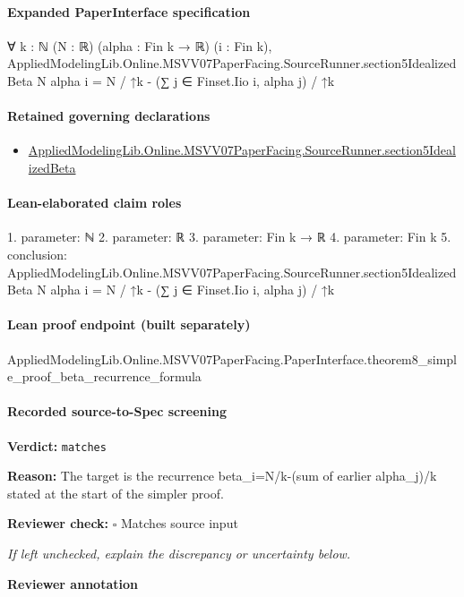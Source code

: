 \documentclass[10pt]{article}
\newcommand{\reviewerbox}{%
  \par\noindent\fbox{\parbox{0.96\linewidth}{\rule{0pt}{0.38in}}}\par
}
\newcommand{\reviewmatch}[1]{%
  \par\noindent\textbf{Reviewer check:} $\square$\; #1\par
  \noindent\emph{If left unchecked, explain the discrepancy or uncertainty below.}\par
}
\begin{document}
\paragraph{Expanded PaperInterface specification}
\begin{ReviewVerbatim}
∀ {k : ℕ} (N : ℝ) (alpha : Fin k → ℝ) (i : Fin k),
  AppliedModelingLib.Online.MSVV07PaperFacing.SourceRunner.section5IdealizedBeta N alpha i =
    N / ↑k - (∑ j ∈ Finset.Iio i, alpha j) / ↑k
\end{ReviewVerbatim}

\paragraph{Retained governing declarations}
\begin{itemize}\raggedright
\item \hyperlink{paper-prerequisite-f037482aa7280cbe}{Applied\allowbreak{}Modeling\allowbreak{}Lib.\allowbreak{}Online.\allowbreak{}MSVV07\allowbreak{}Paper\allowbreak{}Facing.\allowbreak{}Source\allowbreak{}Runner.\allowbreak{}section5\allowbreak{}Idealized\allowbreak{}Beta}
\end{itemize}
\paragraph{Lean-elaborated claim roles}\begin{ReviewVerbatim}
1. parameter: ℕ
2. parameter: ℝ
3. parameter: Fin k → ℝ
4. parameter: Fin k
5. conclusion: AppliedModelingLib.Online.MSVV07PaperFacing.SourceRunner.section5IdealizedBeta N alpha i =
  N / ↑k - (∑ j ∈ Finset.Iio i, alpha j) / ↑k
\end{ReviewVerbatim}

\paragraph{Lean proof endpoint (built separately)}\begin{ReviewVerbatim}
AppliedModelingLib.Online.MSVV07PaperFacing.PaperInterface.theorem8_simple_proof_beta_recurrence_formula
\end{ReviewVerbatim}

\paragraph{Recorded source-to-Spec screening}
\textbf{Verdict:} \texttt{matches}
\\
{\raggedright
\textbf{Reason:} The target is the recurrence beta\_\allowbreak{}i=N/\allowbreak{}k-\allowbreak{}(sum of earlier alpha\_\allowbreak{}j)/\allowbreak{}k stated at the start of the simpler proof.\allowbreak{}
\par}
\reviewmatch{Matches source input}
\noindent\textbf{Reviewer annotation}\par
\reviewerbox
\clearpage
\hypertarget{source-claim-a44d779de9d258a2}{}
\end{document}
